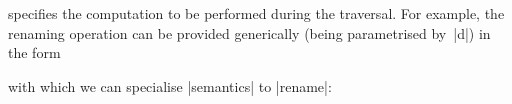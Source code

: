 \documentclass[sigplan,review,fleqn]{acmart}
\renewcommand{\verb}{\collectverb{\color{AgdaFunction}}}
\newcommand{\name}{\collectverb{\it}}
\begin{document}
\begin{code}
	\>[0]\AgdaSpace{}%
	\AgdaSpace{}%
	\AgdaSymbol{(}\AgdaSpace{}%
	\AgdaSymbol{:}\AgdaSpace{}%
	\AgdaSpace{}%
	\AgdaSymbol{)}\AgdaSpace{}%
	\AgdaSymbol{(}\AgdaSpace{}%
	\AgdaSpace{}%
	\AgdaSymbol{:}\AgdaSpace{}%
	\AgdaSpace{}%
	\AgdaSpace{}%
	\AgdaSpace{}%
	\AgdaSpace{}%
	\AgdaSpace{}%
	\AgdaSymbol{)}\AgdaSpace{}%
	\AgdaSymbol{:}\AgdaSpace{}%
	\<
\end{code}
specifies the computation to be performed during the traversal.
For example, the renaming operation can be provided generically (being parametrised by~\name|d|\/) in the form
\begin{code}
	\>[0]\AgdaSpace{}%
	\AgdaSymbol{:}\AgdaSpace{}%
	\AgdaSymbol{(}\AgdaSpace{}%
	\AgdaSymbol{:}\AgdaSpace{}%
	\AgdaSpace{}%
	\AgdaSymbol{)}\AgdaSpace{}%
	\AgdaSpace{}%
	\AgdaSpace{}%
	\AgdaSpace{}%
	\AgdaSpace{}%
	\AgdaSymbol{(}\AgdaSpace{}%
	\AgdaSymbol{)}\<%
\end{code}
with which we can specialise \verb|semantics| to \verb|rename|:
\begin{code}
	\>[0]\AgdaSpace{}%
	\>[1]\AgdaSymbol{:}\AgdaSpace{}%
	\AgdaSpace{}%
	\AgdaSymbol{\{}\AgdaSymbol{\}}\AgdaSpace{}%
	\AgdaSpace{}%
	\AgdaSpace{}%
	\AgdaSpace{}%
	\AgdaSpace{}%
	\AgdaSpace{}%
	\AgdaSpace{}%
	\AgdaSpace{}%
	\AgdaSymbol{)}\AgdaSpace{}\<%
	\\%
	\>[1]\AgdaSpace{}%
	\AgdaSpace{}%
	\AgdaSpace{}%
	\AgdaSpace{}%
	\AgdaSpace{}%
	\AgdaSpace{}%
	\AgdaSpace{}%
	\AgdaSpace{}%
	\AgdaSpace{}%
	\<%
	\\
	\>[0]\AgdaSpace{}%
	\AgdaSymbol{=}\AgdaSpace{}%
	\AgdaSpace{}%
	\AgdaSymbol{(}\AgdaSpace{}%
	\AgdaSymbol{)}\AgdaSpace{}\<%
\end{code}
\end{document}
